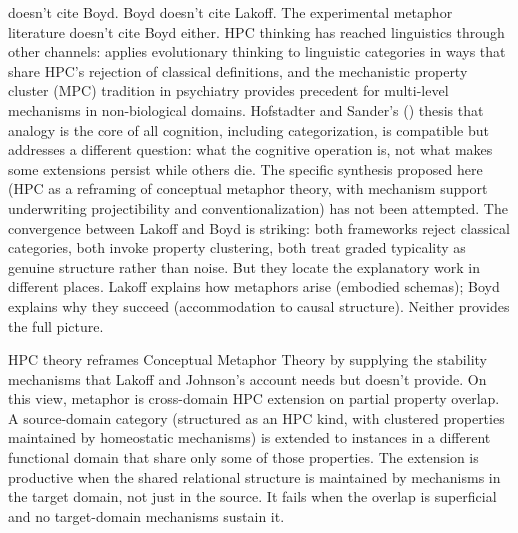 \documentclass[12pt]{article}
\begin{document}
\textcite{lakoff1987} doesn't cite Boyd. Boyd doesn't cite Lakoff. The experimental metaphor literature \citep{flusberg2018, flusberg2024, thibodeau2019, holyoak2018} doesn't cite Boyd either. HPC thinking has reached linguistics through other channels: \textcite{croft2000} applies evolutionary thinking to linguistic categories in ways that share HPC's rejection of classical definitions, and the mechanistic property cluster (MPC) tradition in psychiatry \citep{kendler2011} provides precedent for multi-level mechanisms in non-biological domains. Hofstadter and Sander's (\citeyear{hofstadter2013}) thesis that analogy is the core of all cognition, including categorization, is compatible but addresses a different question: what the cognitive operation is, not what makes some extensions persist while others die. The specific synthesis proposed here (HPC as a reframing of conceptual metaphor theory, with mechanism support underwriting projectibility and conventionalization) has not been attempted. The convergence between Lakoff and Boyd is striking: both frameworks reject classical categories, both invoke property clustering, both treat graded typicality as genuine structure rather than noise. But they locate the explanatory work in different places. Lakoff explains how metaphors arise (embodied schemas); Boyd explains why they succeed (accommodation to causal structure). Neither provides the full picture.

HPC theory reframes Conceptual Metaphor Theory by supplying the stability mechanisms that Lakoff and Johnson's account needs but doesn't provide. On this view, metaphor is cross-domain HPC extension on partial property overlap. A source-domain category (structured as an HPC kind, with clustered properties maintained by homeostatic mechanisms) is extended to instances in a different functional domain that share only some of those properties. The extension is productive when the shared relational structure is maintained by mechanisms in the target domain, not just in the source. It fails when the overlap is superficial and no target-domain mechanisms sustain it.
\end{document}
